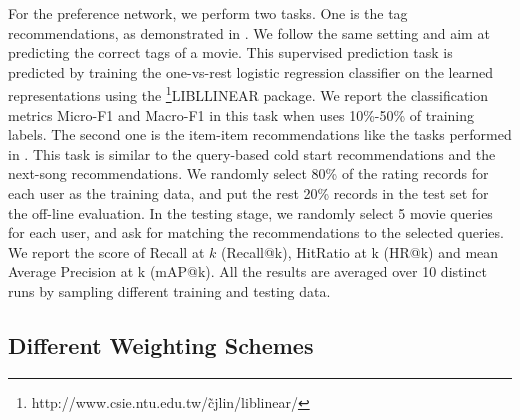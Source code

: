For the preference network, we perform two tasks.  One is the tag recommendations, as demonstrated in \cite{dw,line}.  We follow the same setting and aim at predicting the correct tags of a movie.  This supervised prediction task is predicted by training the one-vs-rest logistic regression classifier on the learned representations using the \footnote{http://www.csie.ntu.edu.tw/\~cjlin/liblinear/}{LIBLLINEAR} package. We report the classification metrics Micro-F1 and Macro-F1 in this task when uses 10\%-50\% of training labels.  The second one is the item-item recommendations like the tasks performed in \cite{hpe,next}.  This task is similar to the query-based cold start recommendations and the next-song recommendations.  We randomly select 80\% of the rating records for each user as the training data, and put the rest 20\% records in the test set for the off-line evaluation.  In the testing stage, we randomly select 5 movie queries for each user, and ask for matching the recommendations to the selected queries.  We report the score of Recall at $k$ (Recall@k), HitRatio at k (HR@k) and mean Average Precision at k (mAP@k).  All the results are averaged over 10 distinct runs by sampling different training and testing data.

\subsection{Different Weighting Schemes}

